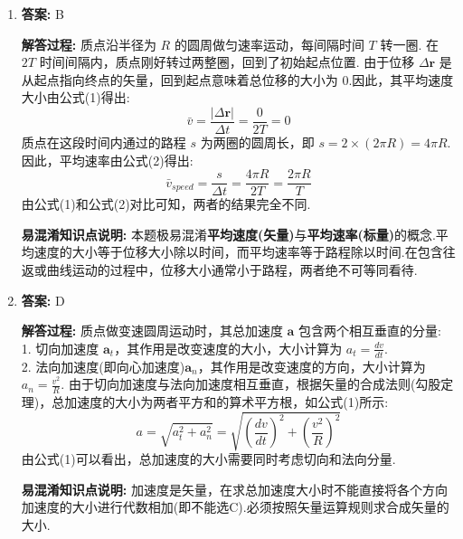 \begin{enumerate}

\item[\textbf{1-4}]

\textbf{答案:} B

\textbf{解答过程:}
质点沿半径为 $R$ 的圆周做匀速率运动，每间隔时间 $T$ 转一圈.
在 $2T$ 时间间隔内，质点刚好转过两整圈，回到了初始起点位置.
由于位移 $\Delta \mathbf{r}$ 是从起点指向终点的矢量，回到起点意味着总位移的大小为 $0$.因此，其平均速度大小由公式(1)得出:
\begin{equation}
	\bar{v} = \frac{|\Delta \mathbf{r}|}{\Delta t} = \frac{0}{2T} = 0
\end{equation}
质点在这段时间内通过的路程 $s$ 为两圈的圆周长，即 $s = 2 \times (2\pi R) = 4\pi R$.因此，平均速率由公式(2)得出:
\begin{equation}
	\bar{v}_{speed} = \frac{s}{\Delta t} = \frac{4\pi R}{2T} = \frac{2\pi R}{T}
\end{equation}
由公式(1)和公式(2)对比可知，两者的结果完全不同.

\textbf{易混淆知识点说明:}
本题极易混淆\textbf{平均速度(矢量)}与\textbf{平均速率(标量)}的概念.平均速度的大小等于位移大小除以时间，而平均速率等于路程除以时间.在包含往返或曲线运动的过程中，位移大小通常小于路程，两者绝不可等同看待.

\vspace{2em}

\item[\textbf{1-5}]


\textbf{答案:} D

\textbf{解答过程:}
质点做变速圆周运动时，其总加速度 $\mathbf{a}$ 包含两个相互垂直的分量:\\
1. 切向加速度 $\mathbf{a}_t$，其作用是改变速度的大小，大小计算为 $a_t = \frac{dv}{dt}$.\\
2. 法向加速度(即向心加速度)$\mathbf{a}_n$，其作用是改变速度的方向，大小计算为 $a_n = \frac{v^2}{R}$.
由于切向加速度与法向加速度相互垂直，根据矢量的合成法则(勾股定理)，总加速度的大小为两者平方和的算术平方根，如公式(1)所示:
\begin{equation}
	a = \sqrt{a_t^2 + a_n^2} = \sqrt{\left(\frac{dv}{dt}\right)^2 + \left(\frac{v^2}{R}\right)^2}
\end{equation}
由公式(1)可以看出，总加速度的大小需要同时考虑切向和法向分量.

\textbf{易混淆知识点说明:}
加速度是矢量，在求总加速度大小时不能直接将各个方向加速度的大小进行代数相加(即不能选C).必须按照矢量运算规则求合成矢量的大小.

\vspace{2em}


\end{enumerate}

